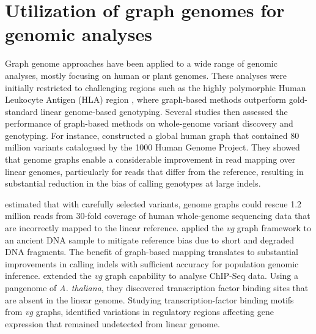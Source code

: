 \documentclass[../main.tex]{subfiles}
\begin{document}
\section[Utilization of the graph genomes]{Utilization of graph genomes for genomic analyses}

Graph genome approaches have been applied to a wide range of genomic analyses, mostly focusing on human or plant genomes. These analyses were initially restricted to challenging regions such as the highly polymorphic Human Leukocyte Antigen (HLA) region \citep{dilthey2015improved,lee2018kourami}, where graph-based methods outperform gold-standard linear genome-based genotyping. Several studies \citep{eggertsson2017graphtyper,garrison2018variation,sibbesen2018accurate,rakocevic2019fast} then assessed the performance of graph-based methods on whole-genome variant discovery and genotyping. For instance, \citet{garrison2018variation} constructed a global human graph that contained 80 million variants catalogued by the 1000 Human Genome Project. They showed that genome graphs enable a considerable improvement in read mapping over linear genomes, particularly for reads that differ from the reference, resulting in substantial reduction in the bias of calling genotypes at large indels. 

\citet{pritt2018forge} estimated that with carefully selected variants, genome graphs could rescue 1.2 million reads from 30-fold coverage of human whole-genome sequencing data that are incorrectly mapped to the linear reference. \citet{martiniano2019removing} applied the \emph{vg} graph framework to an ancient DNA sample to mitigate reference bias due to short and degraded DNA fragments. The benefit of graph-based mapping translates to substantial improvements in calling indels with sufficient accuracy for population genomic inference. \citet{grytten2019graph} extended the \emph{vg} graph capability to analyse ChIP-Seq data. Using a pangenome  of \emph{A. thaliana}, they discovered transcription factor binding sites that are absent in the linear genome. Studying transcription-factor binding motifs from \emph{vg} graphs, \citet{tognon2021grafimo} identified variations in regulatory regions affecting gene expression that remained undetected from linear genome. 
\end{document}
